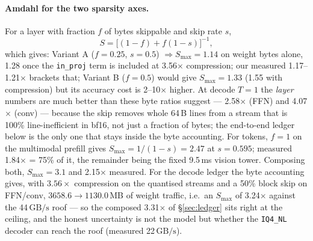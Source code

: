 \documentclass[11pt]{article}
\newcommand{\code}[1]{\texttt{\small #1}}
\newcommand{\gbps}{\ensuremath{\,\mathrm{GB/s}}}
\begin{document}
\paragraph{Amdahl for the two sparsity axes.} For a layer with fraction $f$ of bytes
skippable and skip rate $s$,
\begin{equation}
S=\Big[(1-f)+f(1-s)\Big]^{-1},
\end{equation}
which gives: Variant A ($f{=}0.25$, $s{=}0.5$) $\Rightarrow S_{\max}=1.14$ on weight bytes
alone, 1.28 once the \code{in\_proj} term is included at 3.56$\times$ compression; our
measured 1.17--1.21$\times$ brackets that; Variant B ($f{=}0.5$) would give
$S_{\max}=1.33$ (1.55 with compression) but its accuracy cost is 2--10$\times$ higher.
At decode $T{=}1$ the \emph{layer} numbers are much better than these byte ratios suggest
--- 2.58$\times$ (FFN) and 4.07$\times$ (conv) --- because the skip removes whole 64\,B
lines from a stream that is 100\% line-inefficient in bf16, not just a fraction of bytes;
the end-to-end ledger below is the only one that stays inside the byte accounting.
For tokens, $f{=}1$ on the multimodal prefill gives $S_{\max}=1/(1-s)=2.47$ at $s{=}0.595$;
measured 1.84$\times$ = 75\% of it, the remainder being the fixed 9.5\,ms vision tower.
Composing both, $S_{\max}=3.1$ and 2.15$\times$ measured.
For the decode ledger the byte accounting gives, with $3.56\times$ compression on the
quantised streams and a 50\% block skip on FFN/conv,
$3658.6\rightarrow1130.0$\,MB of weight traffic, i.e.\ an $S_{\max}$ of 3.24$\times$ against
the 44\gbps{} roof --- so the composed 3.31$\times$ of \S\ref{sec:ledger} sits right at the
ceiling, and the honest uncertainty is not the model but whether the \code{IQ4\_NL} decoder
can reach the roof (measured 22\gbps).
\end{document}
